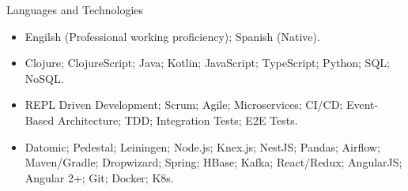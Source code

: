 \documentclass[calibri]{../macdowell-cv/mcdowellcv}
\begin{document}
	\begin{cvsection}{Languages and Technologies}
		\begin{cvsubsection}{}{}{}	
			\begin{itemize}
				\item Engilsh (Professional working proficiency); Spanish (Native).
				\item Clojure; ClojureScript; Java; Kotlin; JavaScript; TypeScript; Python; SQL; NoSQL.
				\item REPL Driven Development; Scrum; Agile; Microservices; CI/CD; Event-Based Architecture; TDD; Integration Tests; E2E Tests.
				\item Datomic; Pedestal; Leiningen; Node.js; Knex.js; NestJS; Pandas; Airflow; Maven/Gradle; Dropwizard; Spring; HBase; Kafka; React/Redux; AngularJS; Angular 2+; Git; Docker; K8s.
			\end{itemize}
		\end{cvsubsection}
	\end{cvsection}
\end{document}
